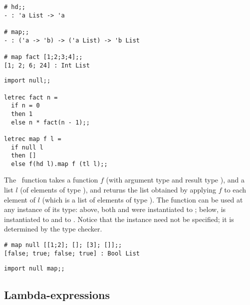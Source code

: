 \documentclass[11pt]{article}
\begin{document}
\begin{session}
\emlsession
\begin{verbatim}
# hd;;
- : 'a List -> 'a

# map;;
- : ('a -> 'b) -> ('a List) -> 'b List

# map fact [1;2;3;4];;
[1; 2; 6; 24] : Int List
\end{verbatim}
\emlfile
\begin{verbatim}
import null;;

letrec fact n =
  if n = 0
  then 1
  else n * fact(n - 1);;

letrec map f l =
  if null l
  then []
  else f(hd l).map f (tl l);;
\end{verbatim}
\emlend
\end{session}

The \ML\ function  takes a function $f$
(with argument type  and result type ), and a list $l$
(of elements of type ), and returns the list obtained by
applying $f$ to each element of $l$ (which is a list of elements of
type ).  The function  can be used at any instance of
its type: above, both  and  were instantiated to
; below,  is instantiated to  and
 to .  Notice that the instance need not be
specified; it is determined by the type checker.

\begin{session}
\emlsession
\begin{verbatim}
# map null [[1;2]; []; [3]; []];;
[false; true; false; true] : Bool List
\end{verbatim}
\emlfile
\begin{verbatim}
import null map;;
\end{verbatim}
\emlend
\end{session}

\subsection {Lambda-expressions}

\end{document}
